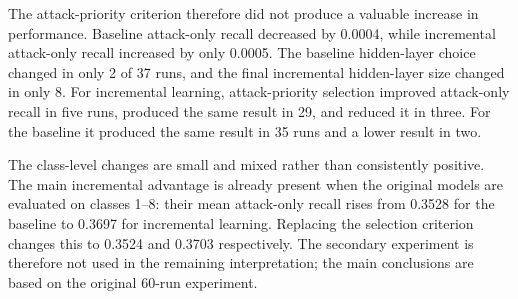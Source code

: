 \documentclass[conference]{IEEEtran}
\begin{document}
The attack-priority criterion therefore did not produce a valuable increase in performance. Baseline attack-only recall decreased by 0.0004, while incremental attack-only recall increased by only 0.0005. The baseline hidden-layer choice changed in only 2 of 37 runs, and the final incremental hidden-layer size changed in only 8. For incremental learning, attack-priority selection improved attack-only recall in five runs, produced the same result in 29, and reduced it in three. For the baseline it produced the same result in 35 runs and a lower result in two.

\begin{table}[H]
    \centering
    \caption{Mean per-class recall of the selected attack-priority models across 37 matched runs. Parentheses show the change from the corresponding original model.}
    \label{tab:attack_class_recall}
    \scriptsize
\end{table}

The class-level changes are small and mixed rather than consistently positive. The main incremental advantage is already present when the original models are evaluated on classes 1--8: their mean attack-only recall rises from 0.3528 for the baseline to 0.3697 for incremental learning. Replacing the selection criterion changes this to 0.3524 and 0.3703 respectively. The secondary experiment is therefore not used in the remaining interpretation; the main conclusions are based on the original 60-run experiment.
\end{document}
